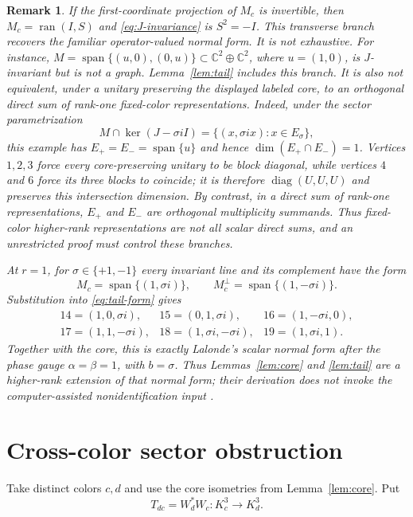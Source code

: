 \documentclass[11pt]{article}
\newtheorem{remark}[theorem]{Remark}
\newcommand{\C}{\mathbb C}
\newcommand{\ran}{\operatorname{ran}}
\begin{document}
\begin{remark}
If the first-coordinate projection of $M_c$ is invertible, then
$M_c=\ran(I,S)$ and \eqref{eq:J-invariance} is $S^2=-I$.  This transverse
branch recovers the familiar operator-valued normal form.  It is not
exhaustive.  For instance,
$M=\operatorname{span}\{(u,0),(0,u)\}\subset\C^2\oplus\C^2$, where
$u=(1,0)$, is $J$-invariant but is not a graph.  Lemma~\ref{lem:tail}
includes this branch.  It is also not equivalent, under a unitary preserving
the displayed labeled core, to an orthogonal direct sum of rank-one fixed-color
representations.  Indeed, under the sector parametrization
\[
 M\cap\ker(J-\sigma iI)=\{(x,\sigma ix):x\in E_\sigma\},
\]
this example has $E_+=E_-=\operatorname{span}\{u\}$ and hence
$\dim(E_+\cap E_-)=1$.  Vertices $1,2,3$ force every core-preserving unitary
to be block diagonal, while vertices $4$ and $6$ force its three blocks to
coincide; it is therefore $\operatorname{diag}(U,U,U)$ and preserves this
intersection dimension.  By contrast, in a direct sum of rank-one
representations, $E_+$ and $E_-$ are orthogonal multiplicity summands.  Thus
fixed-color higher-rank representations are not all scalar direct sums, and
an unrestricted proof must control these branches.

At $r=1$, for $\sigma\in\{+1,-1\}$ every invariant line and its complement
have the form
\[
 M_c=\operatorname{span}\{(1,\sigma i)\},\qquad
 M_c^\perp=\operatorname{span}\{(1,-\sigma i)\}.
\]
Substitution into \eqref{eq:tail-form} gives
\[
\begin{array}{lll}
14=(1,0,\sigma i),&15=(0,1,\sigma i),&16=(1,-\sigma i,0),\\
17=(1,1,-\sigma i),&18=(1,\sigma i,-\sigma i),&19=(1,\sigma i,1).
\end{array}
\]
Together with the core, this is exactly Lalonde's scalar normal form
\cite[Theorem~4.5]{Lalonde2026} after the phase gauge $\alpha=\beta=1$, with
$b=\sigma$.  Thus Lemmas~\ref{lem:core} and \ref{lem:tail} are a higher-rank
extension of that normal form; their derivation does not invoke the
computer-assisted nonidentification input \cite[Lemma~4.4]{Lalonde2026}.
\end{remark}

\section{Cross-color sector obstruction}

Take distinct colors $c,d$ and use the core isometries from
Lemma~\ref{lem:core}.  Put
\[
       T_{dc}=W_d^*W_c:K_c^3\longrightarrow K_d^3.
\]
\end{document}
